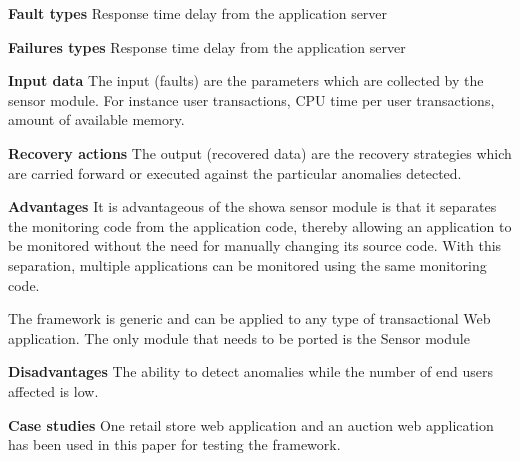 \begin{compactitem}
\item[\textbf{Fault types}]Response time delay from the application server

\item[\textbf{Failures types}]Response time delay from the application server

\item[\textbf{Input data}] The input (faults) are the parameters which are collected by the sensor module. For instance user transactions, CPU time per user transactions, amount of available memory.

\item[\textbf{Recovery actions}]The output (recovered data) are the recovery strategies which are carried forward or executed against the particular anomalies detected.

\item[\textbf{Advantages}] It is advantageous of the showa sensor module is that it separates the monitoring code from the application code, thereby allowing an application to be monitored without the need for manually changing its source code. With this separation, multiple applications can be monitored using the same monitoring code.

The framework is generic and can be applied to any type of transactional Web application. The only module that needs to be ported is the Sensor module

\item[\textbf{Disadvantages}]The ability to detect anomalies while the number of end users affected is low.

\item[\textbf{Case studies}]One retail store web application and an auction web application has been used in this paper for testing the framework.
\end{compactitem}



